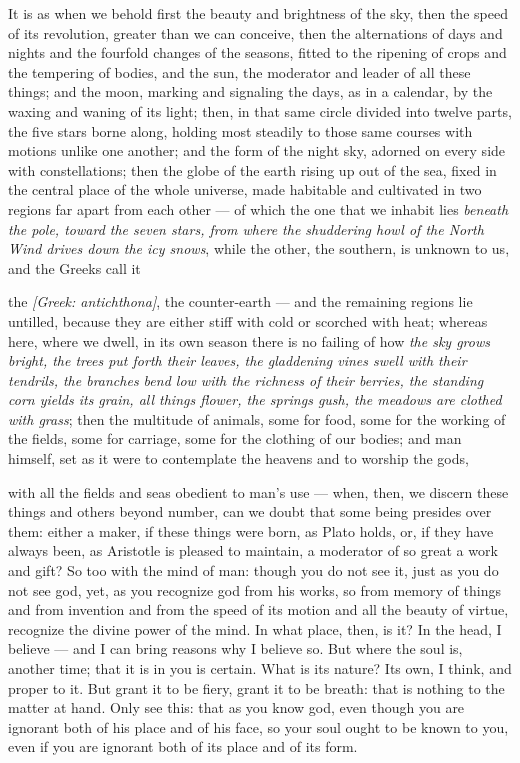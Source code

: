  It is as when we behold first the beauty and brightness of the sky, then the speed of its revolution, greater than we can conceive, then the alternations of days and nights and the fourfold changes of the seasons, fitted to the ripening of crops and the tempering of bodies, and the sun, the moderator and leader of all these things; and the moon, marking and signaling the days, as in a calendar, by the waxing and waning of its light; then, in that same circle divided into twelve parts, the five stars borne along, holding most steadily to those same courses with motions unlike one another; and the form of the night sky, adorned on every side with constellations; then the globe of the earth rising up out of the sea, fixed in the central place of the whole universe, made habitable and cultivated in two regions far apart from each other — of which the one that we inhabit lies \textit{beneath the pole, toward the seven stars, from where the shuddering howl of the North Wind drives down the icy snows}, while the other, the southern, is unknown to us, and the Greeks call it

 the \textit{[Greek: antichthona]}, the counter-earth — and the remaining regions lie untilled, because they are either stiff with cold or scorched with heat; whereas here, where we dwell, in its own season there is no failing of how \textit{the sky grows bright, the trees put forth their leaves, the gladdening vines swell with their tendrils, the branches bend low with the richness of their berries, the standing corn yields its grain, all things flower, the springs gush, the meadows are clothed with grass}; then the multitude of animals, some for food, some for the working of the fields, some for carriage, some for the clothing of our bodies; and man himself, set as it were to contemplate the heavens and to worship the gods,

 with all the fields and seas obedient to man's use — when, then, we discern these things and others beyond number, can we doubt that some being presides over them: either a maker, if these things were born, as Plato holds, or, if they have always been, as Aristotle is pleased to maintain, a moderator of so great a work and gift? So too with the mind of man: though you do not see it, just as you do not see god, yet, as you recognize god from his works, so from memory of things and from invention and from the speed of its motion and all the beauty of virtue, recognize the divine power of the mind. In what place, then, is it? In the head, I believe — and I can bring reasons why I believe so. But where the soul is, another time; that it is in you is certain. What is its nature? Its own, I think, and proper to it. But grant it to be fiery, grant it to be breath: that is nothing to the matter at hand. Only see this: that as you know god, even though you are ignorant both of his place and of his face, so your soul ought to be known to you, even if you are ignorant both of its place and of its form.

